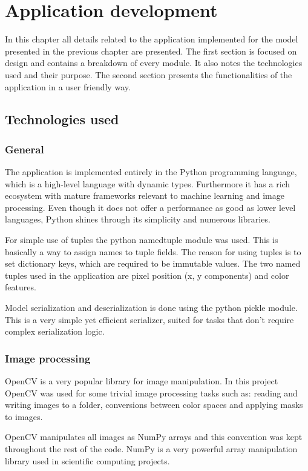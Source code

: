\documentclass[12pt]{report}
\begin{document}
	\chapter{Application development}
	In this chapter all details related to the application implemented for the model presented in the previous chapter are presented. The first section is focused on design and contains a breakdown of every module. It also notes the technologies used and their purpose. The second section presents the functionalities of the application in a user friendly way.
	
	\section{Technologies used}
	
	\subsection{General}
	The application is implemented entirely in the Python programming language, which is a high-level language with dynamic types. Furthermore it has a rich ecosystem with mature frameworks relevant to machine learning and image processing. Even though it does not offer a performance as good as lower level languages, Python shines through its simplicity and numerous libraries.
	
	For simple use of tuples the python namedtuple module was used. This is basically a way to assign names to tuple fields. The reason for using tuples is to set dictionary keys, which are required to be immutable values. The two named tuples used in the application are pixel position (x, y components) and color features.
	
	Model serialization and deserialization is done using the python pickle module. This is a very simple yet efficient serializer, suited for tasks that don't require complex serialization logic.
	
	\subsection{Image processing}
	OpenCV\cite{opencv} is a very popular library for image manipulation. In this project OpenCV was used for some trivial image processing tasks such as: reading and writing images to a folder, conversions between color spaces and applying masks to images. 
	
	OpenCV manipulates all images as NumPy\cite{numpy} arrays and this convention was kept throughout the rest of the code. NumPy is a very powerful array manipulation library used in scientific computing projects.
	
\end{document}
